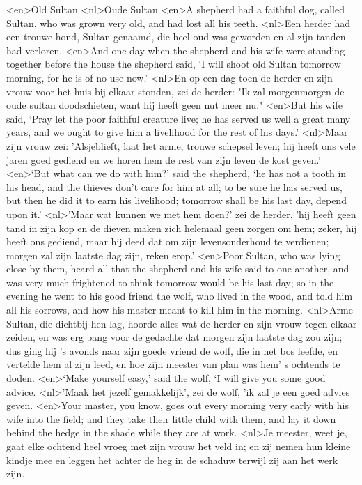 <en>Old Sultan
<nl>Oude Sultan
<en>A shepherd had a faithful dog, called Sultan, who was grown very old, and had lost all his teeth.
<nl>Een herder had een trouwe hond, Sultan genaamd, die heel oud was geworden en al zijn tanden had verloren.
<en>And one day when the shepherd and his wife were standing together before the house the shepherd said, ‘I will shoot old Sultan tomorrow morning, for he is of no use now.’
<nl>En op een dag toen de herder en zijn vrouw voor het huis bij elkaar stonden, zei de herder: "Ik zal morgenmorgen de oude sultan doodschieten, want hij heeft geen nut meer nu."
<en>But his wife said, ‘Pray let the poor faithful creature live; he has served us well a great many years, and we ought to give him a livelihood for the rest of his days.’
<nl>Maar zijn vrouw zei: 'Alsjeblieft, laat  het arme, trouwe schepsel leven; hij heeft ons vele jaren goed gediend en we horen hem de rest van zijn leven de kost geven.'
<en>‘But what can we do with him?’ said the shepherd, ‘he has not a tooth in his head, and the thieves don’t care for him at all; to be sure he has served us, but then he did it to earn his livelihood; tomorrow shall be his last day, depend upon it.’
<nl>'Maar wat kunnen we met hem doen?' zei de herder, 'hij heeft geen tand in zijn kop en de dieven maken zich  helemaal geen zorgen om hem;  zeker, hij heeft ons gediend, maar hij  deed dat om zijn levensonderhoud te verdienen; morgen zal zijn laatste dag zijn, reken erop.'
<en>Poor Sultan, who was lying close by them, heard all that the shepherd and his wife said to one another, and was very much frightened to think tomorrow would be his last day; so in the evening he went to his good friend the wolf, who lived in the wood, and told him all his sorrows, and how his master meant to kill him in the morning.
<nl>Arme Sultan, die dichtbij hen lag, hoorde alles wat de herder en zijn vrouw tegen elkaar zeiden, en was erg bang voor de gedachte dat morgen zijn laatste dag zou zijn; dus ging hij 's avonds naar zijn goede vriend de wolf, die in het bos leefde, en vertelde hem al zijn leed, en hoe zijn meester van plan was hem' s ochtends te doden.
<en>‘Make yourself easy,’ said the wolf, ‘I will give you some good advice.
<nl>'Maak het jezelf gemakkelijk', zei de wolf, 'ik zal je een goed advies geven.
<en>Your master, you know, goes out every morning very early with his wife into the field; and they take their little child with them, and lay it down behind the hedge in the shade while they are at work.
<nl>Je meester, weet je, gaat elke ochtend heel vroeg met zijn vrouw het veld in; en zij nemen hun kleine kindje mee en leggen het achter de heg in de schaduw terwijl zij aan het werk zijn.

